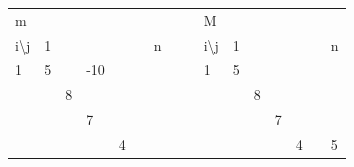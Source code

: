 \documentclass[12pt]{article}
\begin{document}
\begin{table}[]
    \begin{tabular}{llllllllllllllll}
    m                      &                        &                        &                          &                        &                        &                        &  &  & M                      &                        &                        &                        &                        &                        &                        \\
    i\textbackslash{}j     & 1                      &                        &                          &                        &                        & n                      &  &  & i\textbackslash{}j     & 1                      &                        &                        &                        &                        & n                      \\ \cline{2-7} \cline{11-16} 
    \multicolumn{1}{l|}{1} & \multicolumn{1}{l|}{5} & \multicolumn{1}{l|}{}  & \multicolumn{1}{l|}{-10} & \multicolumn{1}{l|}{}  & \multicolumn{1}{l|}{}  & \multicolumn{1}{l|}{}  &  &  & \multicolumn{1}{l|}{1} & \multicolumn{1}{l|}{5} & \multicolumn{1}{l|}{}  & \multicolumn{1}{l|}{}  & \multicolumn{1}{l|}{}  & \multicolumn{1}{l|}{}  & \multicolumn{1}{l|}{}  \\ \cline{2-7} \cline{11-16} 
    \multicolumn{1}{l|}{}  & \multicolumn{1}{l|}{}  & \multicolumn{1}{l|}{8} & \multicolumn{1}{l|}{}    & \multicolumn{1}{l|}{}  & \multicolumn{1}{l|}{}  & \multicolumn{1}{l|}{}  &  &  & \multicolumn{1}{l|}{}  & \multicolumn{1}{l|}{}  & \multicolumn{1}{l|}{8} & \multicolumn{1}{l|}{}  & \multicolumn{1}{l|}{}  & \multicolumn{1}{l|}{}  & \multicolumn{1}{l|}{}  \\ \cline{2-7} \cline{11-16} 
    \multicolumn{1}{l|}{}  & \multicolumn{1}{l|}{}  & \multicolumn{1}{l|}{}  & \multicolumn{1}{l|}{7}   & \multicolumn{1}{l|}{}  & \multicolumn{1}{l|}{}  & \multicolumn{1}{l|}{}  &  &  & \multicolumn{1}{l|}{}  & \multicolumn{1}{l|}{}  & \multicolumn{1}{l|}{}  & \multicolumn{1}{l|}{7} & \multicolumn{1}{l|}{}  & \multicolumn{1}{l|}{}  & \multicolumn{1}{l|}{}  \\ \cline{2-7} \cline{11-16} 
    \multicolumn{1}{l|}{}  & \multicolumn{1}{l|}{}  & \multicolumn{1}{l|}{}  & \multicolumn{1}{l|}{}    & \multicolumn{1}{l|}{4} & \multicolumn{1}{l|}{}  & \multicolumn{1}{l|}{}  &  &  & \multicolumn{1}{l|}{}  & \multicolumn{1}{l|}{}  & \multicolumn{1}{l|}{}  & \multicolumn{1}{l|}{}  & \multicolumn{1}{l|}{4} & \multicolumn{1}{l|}{}  & \multicolumn{1}{l|}{5} \\ \cline{2-7} \cline{11-16} 

\end{tabular}
\end{table}
\end{document}
